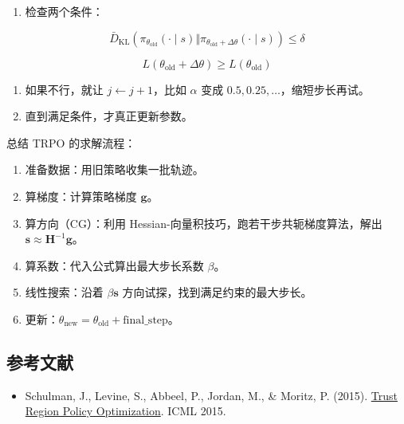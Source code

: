 \begin{enumerate}
\def\labelenumi{\arabic{enumi}.}
\setcounter{enumi}{2}
\tightlist
\item
  检查两个条件：
\end{enumerate}

\[
\bar{D}_{\mathrm{KL}}(
\pi_{\theta_{\mathrm{old}}}(\cdot\mid s)
\Vert
\pi_{\theta_{\mathrm{old}}+\Delta\theta}(\cdot\mid s)
)\le \delta
\]

\[
L(\theta_{\mathrm{old}}+\Delta\theta)\ge L(\theta_{\mathrm{old}})
\]

\begin{enumerate}
\def\labelenumi{\arabic{enumi}.}
\setcounter{enumi}{3}
\tightlist
\item
  如果不行，就让 \(j\leftarrow j+1\)，比如 \(\alpha\) 变成 \(0.5,0.25,\ldots\)，缩短步长再试。
\item
  直到满足条件，才真正更新参数。
\end{enumerate}

总结 TRPO 的求解流程：

\begin{enumerate}
\def\labelenumi{\arabic{enumi}.}
\tightlist
\item
  准备数据：用旧策略收集一批轨迹。
\item
  算梯度：计算策略梯度 \(\mathbf{g}\)。
\item
  算方向（CG）：利用 Hessian-向量积技巧，跑若干步共轭梯度算法，解出 \(\mathbf{s}\approx\mathbf{H}^{-1}\mathbf{g}\)。
\item
  算系数：代入公式算出最大步长系数 \(\beta\)。
\item
  线性搜索：沿着 \(\beta\mathbf{s}\) 方向试探，找到满足约束的最大步长。
\item
  更新：\(\theta_{\mathrm{new}}=\theta_{\mathrm{old}}+\mathrm{final\_step}\)。
\end{enumerate}

\hypertarget{ux53c2ux8003ux6587ux732e-55}{%
\subsection{参考文献}\label{ux53c2ux8003ux6587ux732e-55}}

\begin{itemize}
\tightlist
\item
  Schulman, J., Levine, S., Abbeel, P., Jordan, M., \& Moritz, P. (2015). \href{https://arxiv.org/abs/1502.05477}{Trust Region Policy Optimization}. ICML 2015.
\end{itemize}


